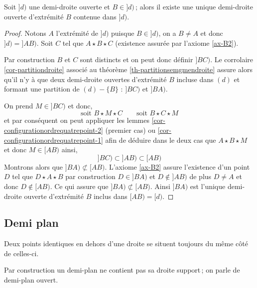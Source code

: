 \begin{cor}\label{cor-demidroitedansdemidroite}
    Soit $]d)$ une demi-droite ouverte et $B\in]d)$\,; alors il existe une unique demi-droite ouverte d'extrémité $B$ contenue dans $]d)$.
\begin{proof}
    Notons $A$ l'extrémité de $]d)$ puisque $B\in]d)$, on a $B\neq A$ et donc $]d)=]AB)$. Soit $C$ tel que $A\star B \star C$ (existence assurée par l'axiome \ref{ax-B2}). 
    
    Par construction $B$ et $C$ sont distincts et on peut donc définir $]BC)$. Le corrolaire \ref{cor-partitiondroite} associé au théorème \ref{th-partitionsemgmendroite} assure alors qu'il n'y à que deux demi-droite ouvertes d'extrémité $B$ incluse dans $(d)$ et formant une partition de $(d)-\{B\}$ : $]BC)$ et $]BA)$.
    
    On prend $M\in ]BC)$ et donc,
    \begin{equation*}
        \text{soit } B\star M\star C \qquad \text{soit } B\star C\star M
    \end{equation*}
    et par conséquent on peut appliquer les lemmes \ref{cor-configurationordrequatrepoint-2} (premier cas) ou \ref{cor-configurationordrequatrepoint-1} afin de déduire dans le deux cas que $A\star B\star M$ et donc $M\in [AB)$ ainsi, 
    \begin{equation*}
        ]BC)\subset]AB)\subset[AB)
    \end{equation*}
    Montrons alors que $]BA)\not\subset [AB)$. L'axiome \ref{ax-B2} assure l'existence d'un point $D$ tel que $D \star A \star B$ par construction $D\in ]BA)$ et $D\notin ]AB)$ de plus $D\neq A$ et donc $D\notin [AB)$. Ce qui assure que $]BA)\not\subset [AB)$. Ainsi $]BA)$ est l'unique demi-droite ouverte d'extrémité $B$ inclus dans $[AB)=[d)$.
\end{proof}
\end{cor}
        
        \subsection{Demi plan}

\begin{rema}
Deux points identiques en dehors d'une droite se situent toujours du même côté de celles-ci. 
\end{rema}

\begin{rema}
Par construction un demi-plan ne contient pas sa droite support\,; on parle de demi-plan ouvert.
\end{rema}

